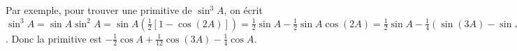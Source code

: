 Par exemple, pour trouver une primitive de $\sin^3{A}$, on écrit $\sin^3{A} = \sin{A}\sin^2{A} = \sin{A}(\frac{1}{2}[1-\cos(2A)]) = \frac{1}{2}\sin{A} - \frac{1}{2}\sin{A}\cos(2A) = \frac{1}{2}\sin{A} - \frac{1}{4}(\sin(3A) - \sin{A})$. Donc la primitive est $-\frac{1}{2}\cos{A} + \frac{1}{12}\cos(3A) - \frac{1}{4}\cos{A}$.
